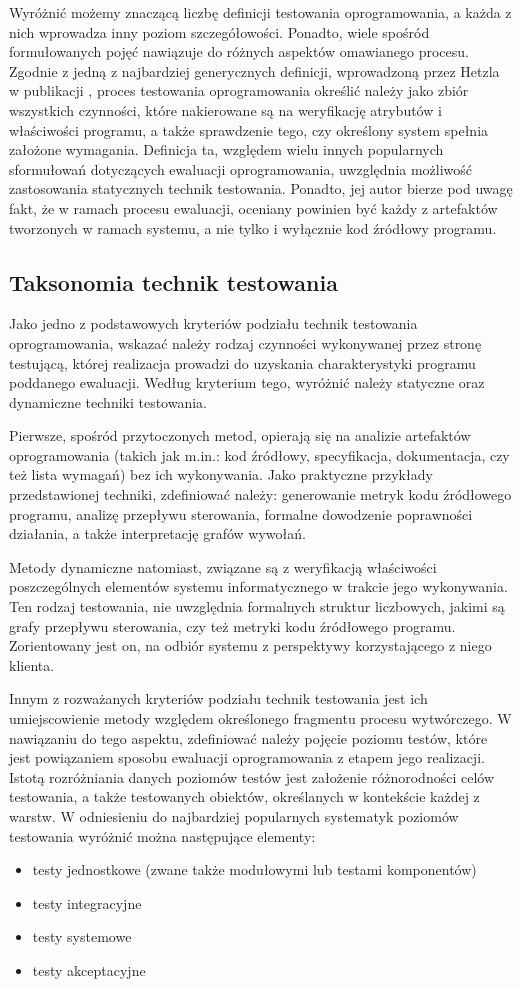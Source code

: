 Wyróżnić możemy znaczącą liczbę definicji testowania oprogramowania, a każda z nich wprowadza inny poziom szczegółowości. Ponadto, wiele spośród formułowanych pojęć nawiązuje do różnych aspektów omawianego procesu. Zgodnie z jedną z najbardziej generycznych definicji, wprowadzoną przez Hetzla w publikacji \cite{hetzel}, proces testowania oprogramowania określić należy jako zbiór wszystkich czynności, które nakierowane są na weryfikację atrybutów i właściwości programu, a także sprawdzenie tego, czy określony system spełnia założone wymagania. Definicja ta, względem wielu innych popularnych sformułowań dotyczących ewaluacji oprogramowania, uwzględnia możliwość zastosowania statycznych technik testowania. Ponadto, jej autor bierze pod uwagę fakt, że w ramach procesu ewaluacji, oceniany powinien być każdy z artefaktów tworzonych w ramach systemu, a nie tylko i wyłącznie kod źródłowy programu.
\subsection*{Taksonomia technik testowania}
Jako jedno z podstawowych kryteriów podziału technik testowania oprogramowania, wskazać należy rodzaj czynności wykonywanej przez stronę testującą, której realizacja prowadzi do uzyskania charakterystyki programu poddanego ewaluacji. Według kryterium tego, wyróżnić należy statyczne oraz dynamiczne techniki testowania.

Pierwsze, spośród przytoczonych metod, opierają się na analizie artefaktów oprogramowania (takich jak m.in.: kod źródłowy, specyfikacja, dokumentacja, czy też lista wymagań) bez ich wykonywania. Jako praktyczne przykłady przedstawionej techniki, zdefiniować należy: generowanie metryk kodu źródłowego programu, analizę przepływu sterowania, formalne dowodzenie poprawności działania, a także interpretację grafów wywołań.

Metody dynamiczne natomiast, związane są z weryfikacją właściwości poszczególnych elementów systemu informatycznego w trakcie jego wykonywania. Ten rodzaj testowania, nie uwzględnia formalnych struktur liczbowych, jakimi są grafy przepływu sterowania, czy też metryki kodu źródłowego programu. Zorientowany jest on, na odbiór systemu z perspektywy korzystającego z niego klienta.

Innym z rozważanych kryteriów podziału technik testowania jest ich umiejscowienie metody względem określonego fragmentu procesu wytwórczego. W nawiązaniu do tego aspektu, zdefiniować należy pojęcie poziomu testów, które jest powiązaniem sposobu ewaluacji oprogramowania z etapem jego realizacji. Istotą rozróżniania danych poziomów testów jest założenie różnorodności celów testowania, a także testowanych obiektów, określanych w kontekście każdej z warstw. W odniesieniu do najbardziej popularnych systematyk poziomów testowania wyróżnić można następujące elementy:
\begin{itemize}
    \item testy jednostkowe (zwane także modułowymi lub testami komponentów)
    \item testy integracyjne
    \item testy systemowe
    \item testy akceptacyjne
\end{itemize}

